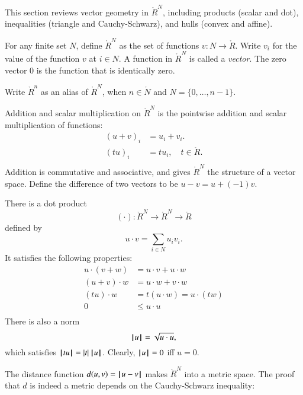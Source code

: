 This section reviews vector geometry in $\ring{R}^N$, including products (scalar and dot), inequalities (triangle and Cauchy-Schwarz), and hulls (convex and affine).

\begin{definition}
For any finite set $N$, define $\ring{R}^N$ as the set of functions
$v:N\to\ring{R}$. Write $v_i$ for the value of the function $v$ at $i\in N$.
A function in $\ring{R}^N$ is called a {\it vector}.  
The zero vector $0$ is the function that is identically zero.  
\end{definition}
Write $\ring{R}^n$ as an alias of $\ring{R}^N$, 
when $n\in\ring{N}$ and $N=\{0,\ldots,n-1\}$.

Addition and scalar multiplication on $\ring{R}^N$
is the pointwise addition and scalar multiplication of functions:
    $$\begin{array}{rll}
    (u + v)_i &= u_i + v_i.\\
    (t u)_i &= t u_i,\quad t\in\ring{R}.\\
    \end{array}
    $$
Addition is commutative and associative, and gives
$\ring{R}^N$ the structure of a vector space.
Define the difference of two vectors to be $u - v = u + (-1) v$.

There is a dot product
$$(\cdot):\ring{R}^N\to\ring{R}^N\to\ring{R}$$ defined by
    $$u\cdot v = \sum_{i\in N} u_i v_i.$$
It satisfies the following
properties:
    $$\begin{array}{rll}
        u \cdot (v + w) &= u \cdot v + u \cdot w\\
        (u + v)\cdot w &= u \cdot w + v \cdot w\\
        (t u)\cdot w &= t(u \cdot w) = u \cdot (t w)\\
        0 &\le u\cdot u\\
    \end{array}$$
There is also a norm
$${{\hskip0.1em|\hskip-0.15em|\hskip0.1em}u{\hskip0.1em|\hskip-0.15em|\hskip0.1em}} = \sqrt{u\cdot u},$$
which satisfies ${{\hskip0.1em|\hskip-0.15em|\hskip0.1em} t u {\hskip0.1em|\hskip-0.15em|\hskip0.1em}} = |t| \, {{\hskip0.1em|\hskip-0.15em|\hskip0.1em}u{\hskip0.1em|\hskip-0.15em|\hskip0.1em}}$.  Clearly, ${{\hskip0.1em|\hskip-0.15em|\hskip0.1em}u{\hskip0.1em|\hskip-0.15em|\hskip0.1em}}=0$  iff $u=0$.

The distance function $d(u,v) = {\hskip0.1em|\hskip-0.15em|\hskip0.1em} u  -  v{\hskip0.1em|\hskip-0.15em|\hskip0.1em}$ makes
$\ring{R}^N$ into a metric space.  
The proof that $d$ is indeed a metric depends on the Cauchy-Schwarz inequality:


